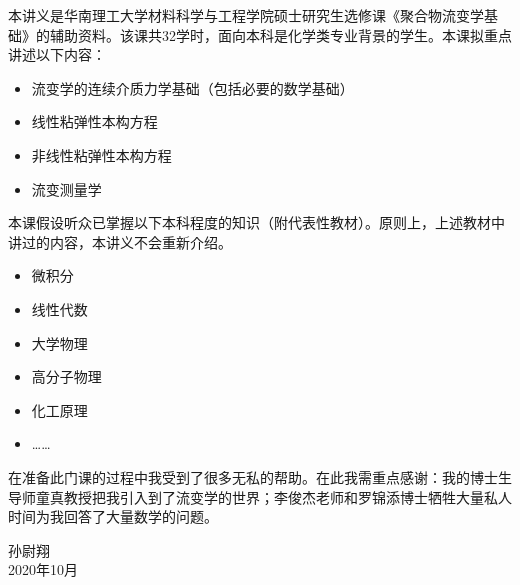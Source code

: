 \documentclass[main.tex]{subfiles}
\begin{document}
本讲义是华南理工大学材料科学与工程学院硕士研究生选修课《聚合物流变学基础》的辅助资料。该课共32学时，面向本科是化学类专业背景的学生。本课拟重点讲述以下内容：

\begin{itemize}
    \item 流变学的连续介质力学基础（包括必要的数学基础）
    \item 线性粘弹性本构方程
    \item 非线性粘弹性本构方程
    \item 流变测量学
\end{itemize}

本课假设听众已掌握以下本科程度的知识（附代表性教材）。原则上，上述教材中讲过的内容，本讲义不会重新介绍。

\begin{itemize}
    \item 微积分\cite{华工高数2009上,华工高数2009下}
    \item 线性代数\cite{周胜林2012线性代数}
    \item 大学物理\cite{邓文基2009大物上}
    \item 高分子物理\cite{何曼君2007}
    \item 化工原理\cite{钟理化工原理上册2008}
    \item ……
\end{itemize}

在准备此门课的过程中我受到了很多无私的帮助。在此我需重点感谢：我的博士生导师童真教授把我引入到了流变学的世界；李俊杰老师和罗锦添博士牺牲大量私人时间为我回答了大量数学的问题。

\begin{flushright}
孙尉翔\\
2020年10月
\end{flushright}
\end{document}
